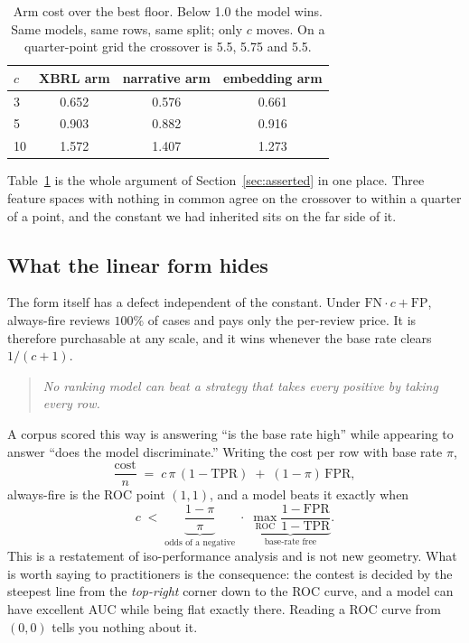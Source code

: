 \documentclass[11pt]{article}
\newcommand{\cost}{\ensuremath{\mathrm{FN}\cdot c + \mathrm{FP}}}
\begin{document}
\begin{table}[t]
\centering\small
\begin{tabular}{lccc}
\toprule
$c$ & XBRL arm & narrative arm & embedding arm \\
\midrule
3  & 0.652 & 0.576 & 0.661 \\
5  & 0.903 & 0.882 & 0.916 \\
10 & 1.572 & 1.407 & 1.273 \\
\bottomrule
\end{tabular}
\caption{Arm cost over the best floor. Below 1.0 the model wins. Same models, same rows, same
split; only $c$ moves. On a quarter-point grid the crossover is 5.5, 5.75 and 5.5.}
\label{tab:sweep}
\end{table}

Table~\ref{tab:sweep} is the whole argument of Section~\ref{sec:asserted} in one place. Three
feature spaces with nothing in common agree on the crossover to within a quarter of a point,
and the constant we had inherited sits on the far side of it.

\subsection{What the linear form hides}

The form itself has a defect independent of the constant. Under \cost{}, always-fire reviews
$100\%$ of cases and pays only the per-review price. It is therefore purchasable at any scale,
and it wins whenever the base rate clears $1/(c+1)$.

\begin{quote}
\emph{No ranking model can beat a strategy that takes every positive by taking every row.}
\end{quote}

A corpus scored this way is answering ``is the base rate high'' while appearing to answer ``does
the model discriminate.'' Writing the cost per row with base rate $\pi$,
\[
\frac{\text{cost}}{n} \;=\; c\,\pi\,(1-\mathrm{TPR}) \;+\; (1-\pi)\,\mathrm{FPR},
\]
always-fire is the ROC point $(1,1)$, and a model beats it exactly when
\[
c \;<\; \underbrace{\frac{1-\pi}{\pi}}_{\text{odds of a negative}}\;\cdot\;
\underbrace{\max_{\mathrm{ROC}} \frac{1-\mathrm{FPR}}{1-\mathrm{TPR}}}_{\text{base-rate free}} .
\]
This is a restatement of iso-performance analysis \citep{provost2001} and is not new geometry.
What is worth saying to practitioners is the consequence: the contest is decided by the steepest
line from the \emph{top-right} corner down to the ROC curve, and a model can have excellent AUC
while being flat exactly there. Reading a ROC curve from $(0,0)$ tells you nothing about it.
\end{document}
